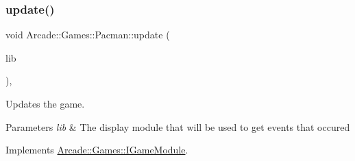 \subsubsection{\texorpdfstring{update()}{update()}}
{\footnotesize\ttfamily void Arcade\+::\+Games\+::\+Pacman\+::update (\begin{DoxyParamCaption}\item[{const \mbox{\hyperlink{classArcade_1_1Display_1_1IDisplayModule}{Arcade\+::\+Display\+::\+I\+Display\+Module}} \&}]{lib }\end{DoxyParamCaption})\hspace{0.3cm}{\ttfamily [final]}, {\ttfamily [virtual]}}



Updates the game. 


\begin{DoxyParams}{Parameters}
{\em lib} & The display module that will be used to get events that occured \\
\hline
\end{DoxyParams}


Implements \mbox{\hyperlink{classArcade_1_1Games_1_1IGameModule_a421d1064fcc112dfc7ea025fc7f88aa7}{Arcade\+::\+Games\+::\+I\+Game\+Module}}.

